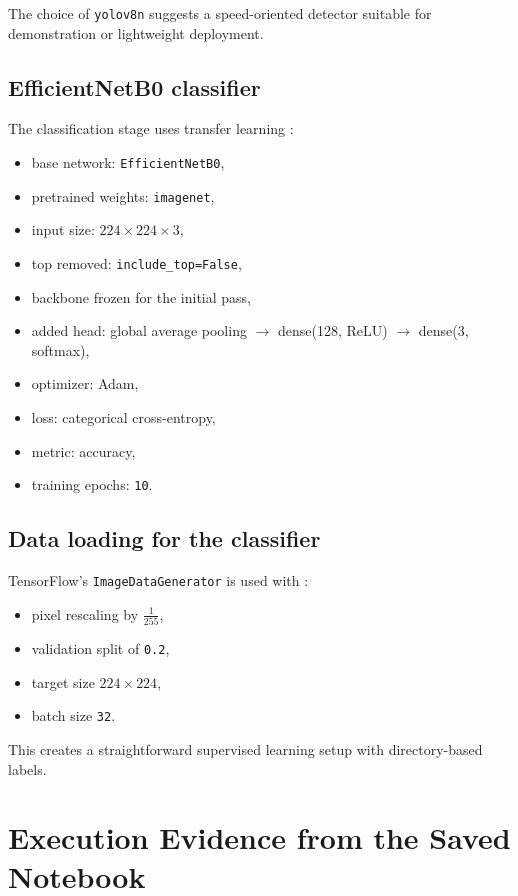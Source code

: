 \documentclass[12pt,a4paper]{article}
\begin{document}
The choice of \texttt{yolov8n} suggests a speed-oriented detector suitable for demonstration or lightweight deployment.

\subsection{EfficientNetB0 classifier}
The classification stage uses transfer learning \cite{kerasapp,efficientnet,tensorflowtransfer}:
\begin{itemize}
    \item base network: \texttt{EfficientNetB0},
    \item pretrained weights: \texttt{imagenet},
    \item input size: \(224 \times 224 \times 3\),
    \item top removed: \texttt{include\_top=False},
    \item backbone frozen for the initial pass,
    \item added head: global average pooling \(\rightarrow\) dense(128, ReLU) \(\rightarrow\) dense(3, softmax),
    \item optimizer: Adam,
    \item loss: categorical cross-entropy,
    \item metric: accuracy,
    \item training epochs: \texttt{10}.
\end{itemize}

\subsection{Data loading for the classifier}
TensorFlow's \texttt{ImageDataGenerator} is used with \cite{imagedatagenerator}:
\begin{itemize}
    \item pixel rescaling by \(\frac{1}{255}\),
    \item validation split of \texttt{0.2},
    \item target size \(224 \times 224\),
    \item batch size \texttt{32}.
\end{itemize}

This creates a straightforward supervised learning setup with directory-based labels.

\section{Execution Evidence from the Saved Notebook}
\end{document}
